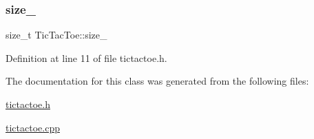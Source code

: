 \subsubsection{\texorpdfstring{size\+\_\+}{size\_}}
{\footnotesize\ttfamily size\+\_\+t Tic\+Tac\+Toe\+::size\+\_\+\hspace{0.3cm}{\ttfamily [protected]}}



Definition at line 11 of file tictactoe.\+h.



The documentation for this class was generated from the following files\+:\begin{DoxyCompactItemize}
\item 
\hyperlink{tictactoe_8h}{tictactoe.\+h}\item 
\hyperlink{tictactoe_8cpp}{tictactoe.\+cpp}\end{DoxyCompactItemize}
